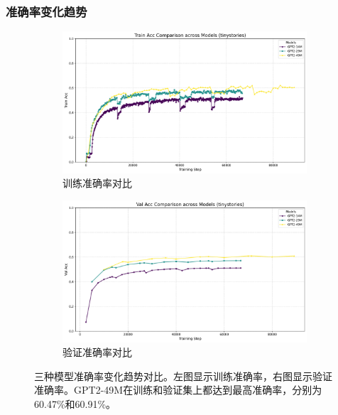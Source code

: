 \documentclass{article}
\begin{document}
\vspace{0.5cm}

\subsubsection{准确率变化趋势}
\begin{figure}[h]
\centering
\begin{subfigure}[b]{0.45\textwidth}
\includegraphics[width=\textwidth]{../visualize/metrics/train_acc_comparison.png}
\caption{训练准确率对比}
\label{fig:train_acc}
\end{subfigure}
\hfill
\begin{subfigure}[b]{0.45\textwidth}
\includegraphics[width=\textwidth]{../visualize/metrics/val_acc_comparison.png}
\caption{验证准确率对比}
\label{fig:val_acc}
\end{subfigure}
\caption{三种模型准确率变化趋势对比。左图显示训练准确率，右图显示验证准确率。GPT2-49M在训练和验证集上都达到最高准确率，分别为60.47\%和60.91\%。}
\label{fig:acc_comparison}
\end{figure}
\end{document}
